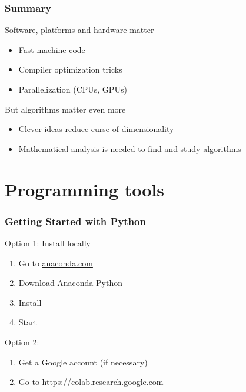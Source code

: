 \begin{frame}
    \frametitle{Summary}

    Software, platforms and hardware  matter
    \begin{itemize}
        \item Fast machine code
            \vspace{0.5em}
        \item Compiler optimization tricks
            \vspace{0.5em}
        \item Parallelization (CPUs, GPUs)
    \end{itemize}

    \vspace{2em}

    But algorithms matter even more


    \begin{itemize}
        \item Clever ideas reduce curse of dimensionality
            \vspace{0.5em}
        \item Mathematical analysis is needed to find and study algorithms
    \end{itemize}


\end{frame}


\section{Programming tools}


\begin{frame}
    \frametitle{Getting Started with Python}

    Option 1: Install locally

        \vspace{0.5em}

    \begin{enumerate}
        \item Go to \url{anaconda.com}
            \vspace{0.5em}
        \item Download Anaconda Python
            \vspace{0.5em}
        \item Install
            \vspace{0.5em}
        \item Start 
    \end{enumerate}

            \vspace{0.5em}
    Option 2:
    \begin{enumerate}
        \item Get a Google account (if necessary)
        \item Go to \url{https://colab.research.google.com}
    \end{enumerate}

\end{frame}

